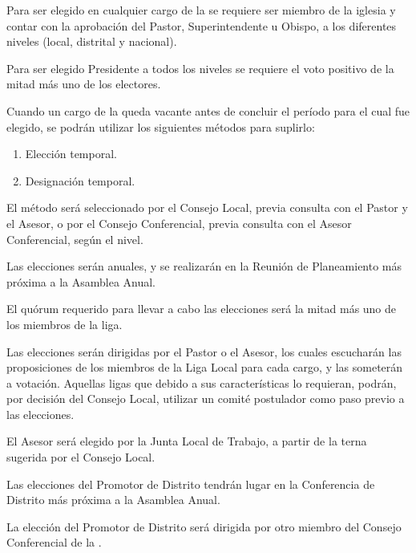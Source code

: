 

\article
\label{requisito-cargos}
Para ser elegido en cualquier cargo de la \LMJ{} se requiere ser miembro de la iglesia y contar con la aprobación del Pastor, Superintendente u Obispo, a los diferentes niveles (local, distrital y nacional).

\article
\label{requisito-presidente}
Para ser elegido Presidente a todos los niveles se requiere el voto positivo de la mitad más uno de los electores.

\article
\label{cargos-vacantes}
Cuando un cargo de la \LMJ{} queda vacante antes de concluir el período para el cual fue elegido, se podrán utilizar los siguientes métodos para suplirlo:
\begin{enumerate}[label=\alph*),noitemsep]
    \item Elección temporal.
    \item Designación temporal.
\end{enumerate}
El método será seleccionado por el Consejo Local, previa consulta con el Pastor y el Asesor, o por el Consejo Conferencial, previa consulta con el Asesor Conferencial, según el nivel.


\article
Las elecciones serán anuales, y se realizarán en la Reunión de Planeamiento más próxima a la Asamblea Anual.

\article
El quórum requerido para llevar a cabo las elecciones será la mitad más uno de los miembros de la liga.

\article
Las elecciones serán dirigidas por el Pastor o el Asesor, los cuales escucharán las proposiciones de los miembros de la Liga Local para cada cargo, y las someterán a votación. Aquellas ligas que debido a sus características lo requieran, podrán, por decisión del Consejo Local, utilizar un comité postulador como paso previo a las elecciones.

\article
El Asesor será elegido por la Junta Local de Trabajo, a partir de la terna sugerida por el Consejo Local.


\article
Las elecciones del Promotor de Distrito tendrán lugar en la Conferencia de Distrito más próxima a la Asamblea Anual.

\article
\label{direccion-eleccion-promotor}
La elección del Promotor de Distrito será dirigida por otro miembro del Consejo Conferencial de la \LMJ{}.

